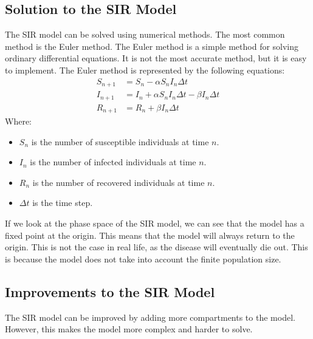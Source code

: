 \documentclass{report}
\begin{document}
\subsection{Solution to the SIR Model}
The SIR model can be solved using numerical methods. The most common method is the Euler method. The Euler method is a simple method for solving ordinary differential equations. It is not the most accurate method, but it is easy to implement. The Euler method is represented by the following equations:
\begin{align}
S_{n+1} &= S_n - \alpha S_n I_n \Delta t \label{sir_euler_S} \\
I_{n+1} &= I_n + \alpha S_n I_n \Delta t - \beta I_n \Delta t \label{sir_euler_I} \\
R_{n+1} &= R_n + \beta I_n \Delta t \label{sir_euler_R}
\end{align}
Where:
\begin{itemize}
    \item $S_n$ is the number of susceptible individuals at time $n$.
    \item $I_n$ is the number of infected individuals at time $n$.
    \item $R_n$ is the number of recovered individuals at time $n$.
    \item $\Delta t$ is the time step.
\end{itemize}
If we look at the phase space of the SIR model, we can see that the model has a fixed point at the origin. This means that the model will always return to the origin. This is not the case in real life, as the disease will eventually die out. This is because the model does not take into account the finite population size.
\subsection{Improvements to the SIR Model}
The SIR model can be improved by adding more compartments to the model. However, this makes the model more complex and harder to solve.
\end{document}
